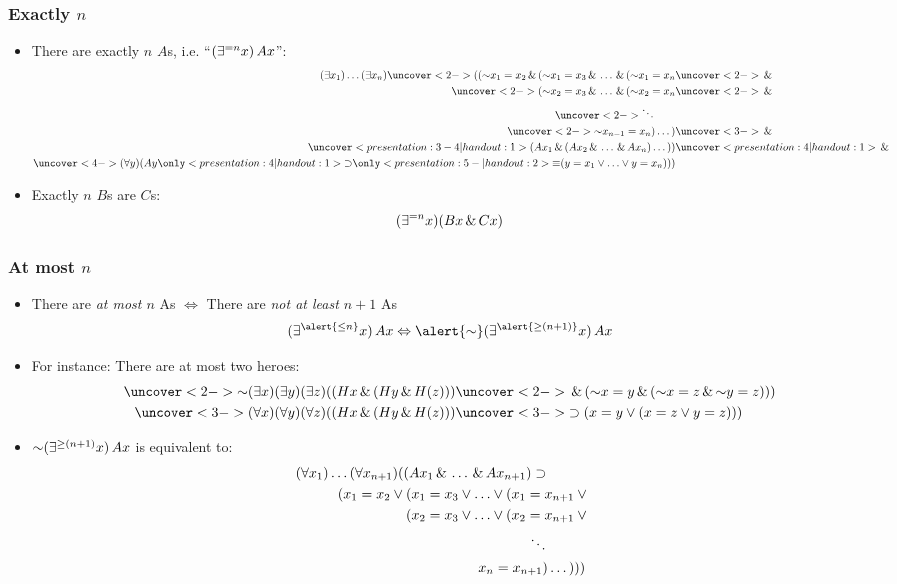 \begin{frame}
  \frametitle{Exactly $n$}

\begin{itemize}
\item<1-> There are exactly $n$ $A$s, i.e. ``$(\exists^{=n} x)\,Ax$'':
\begin{align*}
\qt{\exists}{x_1}\dots\qt{\exists}{x_n}\uncover<2->{((\enot x_1 = x_2 \land (\enot x_1 = x_3 \land \dots \land (\enot x_1 = x_n} & \uncover<2->{{} \land {}}\\
\uncover<2->{(\enot x_2 = x_3 \land \dots \land (\enot x_2 = x_n} & \uncover<2->{{} \land {}}\\
\uncover<2->{\ddots}\qquad &\\
\uncover<2->{\enot x_{n-1} = x_n)\dots)} & \uncover<3->{{} \land {}}\\
\uncover<presentation:3-4|handout:1>{(A\qv{x_1} \land (A\qv{x_2} \land \dots \land A\qv{x_n})\dots))} & \uncover<presentation:4|handout:1>{{} \eand {}}\\
\uncover<4->{\qt{\forall}{y}(A\qv{y} \only<presentation: 4|handout:1>{\eif} \only<presentation: 5-|handout:2>{\eiff} (y = x_1 \lor \dots \lor y=x_n)))}
\end{align*}
\item<6-> Exactly $n$ $B$s are $C$s:
\[
(\exists^{=n} x) (Bx \,\&\, Cx)
\]
\end{itemize}
\end{frame}

\begin{frame}
    \frametitle{At most $n$}

\begin{itemize}
\item<1-> There are \emph{at most $n$} As $\Leftrightarrow$ There are
\emph{not at least $n+1$} As
\[
\qt{\exists^{\alert{\le n}}}{x}\, A\qv{x} \Leftrightarrow \alert{\lnot} \qt{\exists^{\alert{\ge(n+1)}}}{x} \, A\qv{x}
\]
\item<2-> For instance: There are at most two heroes:
\begin{align*}
\uncover<2->{\lnot \qt{\exists}{x}\qt{\exists}{y}\qt{\exists}{z}((H\qv{x} \land (H\qv{y} \land H(z)))}
& \uncover<2->{\land (\lnot x =y \land (\lnot x = z \land \lnot y = z)) )}\\
\uncover<3->{\qt{\forall}{x}\qt{\forall}{y}\qt{\forall}{z}((H\qv{x} \land (H\qv{y} \land H(z)))
} &\uncover<3->{\eif (x =y \lor ( x = z \lor y = z)) )}
\end{align*}
\item<4-> $\lnot \qt{\exists^{\ge(n+1)}}{x} \, A\qv{x}$ is equivalent to:
\begin{align*}
\qt{\forall}{x_1}\dots\qt{\forall}{x_{n+1}} ((A\qv{x_1} \land \dots \land A\qv{x_{n+1}}) \eif \qquad \\
(x_1 = x_2 \lor (x_1 = x_3 \lor \dots \lor (x_1 = x_{n+1} & {} \lor {}\\
(x_2 = x_3 \lor \dots \lor (x_2 = x_{n+1} & {} \lor {}\\
\ddots\qquad &\\
x_n = x_{n+1})\dots) & ))
\end{align*}
\end{itemize}
\end{frame}

